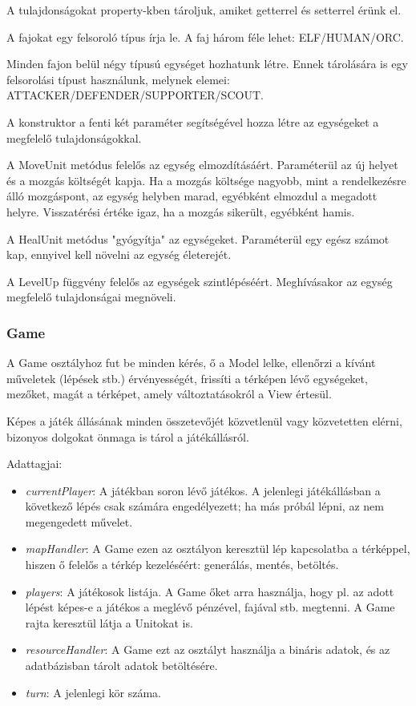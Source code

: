 \documentclass[a4paper,12pt]{report}
\begin{document}
A tulajdonságokat property-kben tároljuk, amiket getterrel és setterrel érünk el.

A fajokat egy felsoroló típus írja le. A faj három féle lehet: ELF/HUMAN/ORC.

Minden fajon belül négy típusú egységet hozhatunk létre. Ennek tárolására is egy felsorolási típust használunk, melynek elemei: ATTACKER/DEFENDER/SUPPORTER/SCOUT.

A konstruktor a fenti két paraméter segítségével hozza létre az egységeket a megfelelő tulajdonságokkal.

A MoveUnit metódus felelős az egység elmozdításáért. Paraméterül az új helyet és a mozgás költségét kapja. Ha a mozgás költsége nagyobb, mint a rendelkezésre álló mozgáspont, az egység helyben marad, egyébként elmozdul a megadott helyre. Visszatérési értéke igaz, ha a mozgás sikerült, egyébként hamis.

A HealUnit metódus "gyógyítja" az egységeket. Paraméterül egy egész számot kap, ennyivel kell növelni az egység életerejét.

A LevelUp függvény felelős az egységek szintlépéséért. Meghívásakor az egység megfelelő tulajdonságai megnöveli.

\subsubsection{Game}
A Game osztályhoz fut be minden kérés, ő a Model lelke, ellenőrzi a kívánt műveletek (lépések stb.) érvényességét, frissíti a térképen lévő egységeket, mezőket, magát a térképet, amely változtatásokról a View értesül.

Képes a játék állásának minden összetevőjét közvetlenül vagy közvetetten elérni, bizonyos dolgokat önmaga is tárol a játékállásról.

Adattagjai:
\begin{itemize}
\item \textit{currentPlayer}: A játékban soron lévő játékos. A jelenlegi játékállásban a következő lépés csak számára engedélyezett; ha más próbál lépni, az nem megengedett művelet.
\item \textit{mapHandler}: A Game ezen az osztályon keresztül lép kapcsolatba a térképpel, hiszen ő felelős a térkép kezeléséért: generálás, mentés, betöltés.
\item \textit{players}: A játékosok listája. A Game őket arra használja, hogy pl. az adott lépést képes-e a játékos a meglévő pénzével, fajával stb. megtenni. A Game rajta keresztül látja a Unitokat is.
\item \textit{resourceHandler}: A Game ezt az osztályt használja a bináris adatok, és az adatbázisban tárolt adatok betöltésére.
\item \textit{turn}: A jelenlegi kör száma.
\end{itemize}
\end{document}
